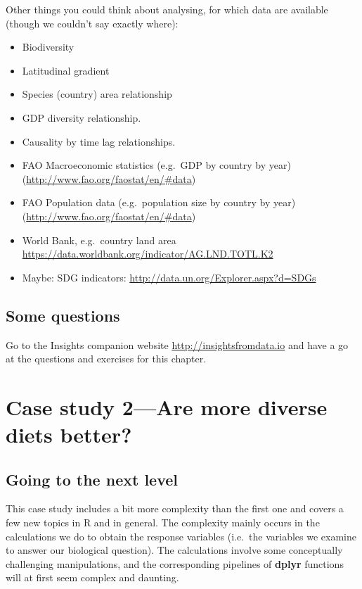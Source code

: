 \documentclass[]{book}
\providecommand{\tightlist}{%
  \setlength{\itemsep}{0pt}\setlength{\parskip}{0pt}}
\begin{document}
Other things you could think about analysing, for which data are available (though we couldn't say exactly where):

\begin{itemize}
\tightlist
\item
  Biodiversity
\item
  Latitudinal gradient
\item
  Species (country) area relationship
\item
  GDP diversity relationship.
\item
  Causality by time lag relationships.
\item
  FAO Macroeconomic statistics (e.g.~GDP by country by year) (\url{http://www.fao.org/faostat/en/\#data})
\item
  FAO Population data (e.g.~population size by country by year) (\url{http://www.fao.org/faostat/en/\#data})
\item
  World Bank, e.g.~country land area \url{https://data.worldbank.org/indicator/AG.LND.TOTL.K2}
\item
  Maybe: SDG indicators: \url{http://data.un.org/Explorer.aspx?d=SDGs}
\end{itemize}

\hypertarget{some-questions}{%
\section{Some questions}\label{some-questions}}

Go to the Insights companion website \url{http://insightsfromdata.io} and have a go at the questions and exercises for this chapter.

\hypertarget{CS2-1}{%
\chapter{Case study 2---Are more diverse diets better?}\label{CS2-1}}

\hypertarget{going-to-the-next-level}{%
\section{Going to the next level}\label{going-to-the-next-level}}

This case study includes a bit more complexity than the first one and covers a few new topics in R and in general. The complexity mainly occurs in the calculations we do to obtain the response variables (i.e.~the variables we examine to answer our biological question). The calculations involve some conceptually challenging manipulations, and the corresponding pipelines of \textbf{dplyr} functions will at first seem complex and daunting.
\end{document}
